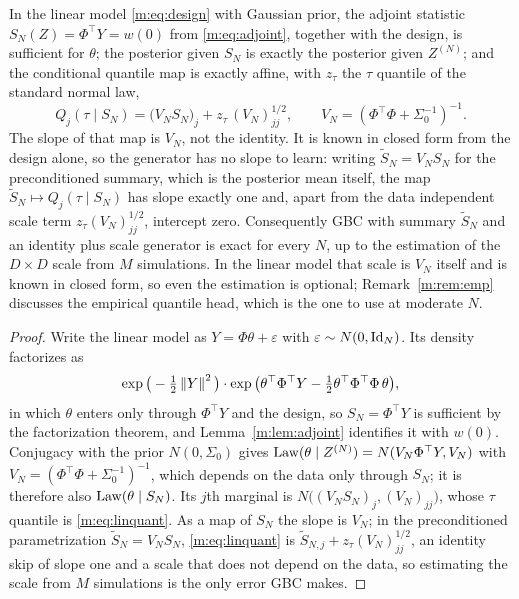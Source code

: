 \begin{proposition}\label{m:prop:linsuff}
In the linear model \eqref{m:eq:design} with Gaussian prior, the adjoint statistic $S_N(Z)=\Phi^\top Y=w(0)$ from \eqref{m:eq:adjoint}, together with the design, is sufficient for $\theta$; the posterior given $S_N$ is exactly the posterior given $Z^{(N)}$; and the conditional quantile map is exactly affine, with $z_\tau$ the $\tau$ quantile of the standard normal law,
\begin{equation}\label{m:eq:linquant}
Q_j(\tau\mid S_N)=\big(V_NS_N\big)_j+z_\tau\,(V_N)_{jj}^{1/2},\qquad V_N=(\Phi^\top\Phi+\Sigma_0^{-1})^{-1}.
\end{equation}
The slope of that map is $V_N$, not the identity. It is known in closed form from the design alone, so the generator has no slope to learn: writing $\tilde S_N=V_NS_N$ for the preconditioned summary, which is the posterior mean itself, the map $\tilde S_N\mapsto Q_j(\tau\mid S_N)$ has slope exactly one and, apart from the data independent scale term $z_\tau(V_N)_{jj}^{1/2}$, intercept zero. Consequently GBC with summary $\tilde S_N$ and an identity plus scale generator is exact for every $N$, up to the estimation of the $D\times D$ scale from $M$ simulations. In the linear model that scale is $V_N$ itself and is known in closed form, so even the estimation is optional; Remark~\ref{m:rem:emp} discusses the empirical quantile head, which is the one to use at moderate $N$.
\end{proposition}

\begin{proof}
Write the linear model as $Y=\Phi\theta+\varepsilon$ with $\varepsilon\sim N(0,\operatorname{Id}_N)$. Its density factorizes as
\[
\exp\big(-\tfrac12\left\|Y\right\|^2\big)\cdot\exp\big(\theta^\top\Phi^\top Y-\tfrac12\theta^\top\Phi^\top\Phi\,\theta\big),
\]
in which $\theta$ enters only through $\Phi^\top Y$ and the design, so $S_N=\Phi^\top Y$ is sufficient by the factorization theorem, and Lemma~\ref{m:lem:adjoint} identifies it with $w(0)$. Conjugacy with the prior $N(0,\Sigma_0)$ gives $\operatorname{Law}(\theta\mid Z^{(N)})=N(V_N\Phi^\top Y,V_N)$ with $V_N=(\Phi^\top\Phi+\Sigma_0^{-1})^{-1}$, which depends on the data only through $S_N$; it is therefore also $\operatorname{Law}(\theta\mid S_N)$. Its $j$th marginal is $N\big((V_NS_N)_j,(V_N)_{jj}\big)$, whose $\tau$ quantile is \eqref{m:eq:linquant}. As a map of $S_N$ the slope is $V_N$; in the preconditioned parametrization $\tilde S_N=V_NS_N$, \eqref{m:eq:linquant} is $\tilde S_{N,j}+z_\tau(V_N)_{jj}^{1/2}$, an identity skip of slope one and a scale that does not depend on the data, so estimating the scale from $M$ simulations is the only error GBC makes.
\end{proof}

